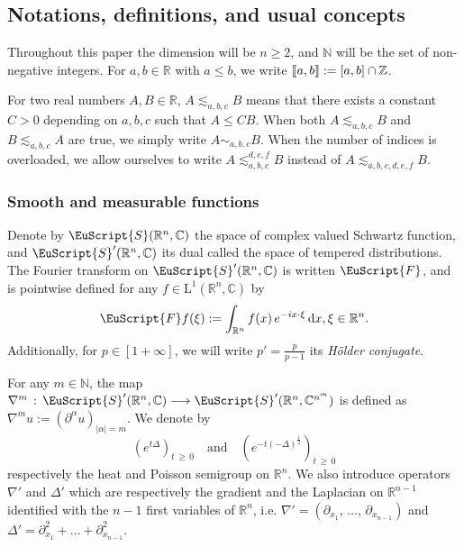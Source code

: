 \documentclass[10pt]{amsart}
\theoremstyle{definition}\newtheorem{defi}[theo]{Definition}\newtheorem{rema}[theo]{Remark}\newtheorem{exam}[theo]{Example}\newtheorem{exem}[theo]{Example}\newtheorem{nota}[theo]{Notation}
\newcommand{\bbR}{\mathbb{R}}
\newcommand{\bbC}{\mathbb{C}}
\newcommand{\bbN}{\mathbb{N}}
\newcommand{\bbZ}{\mathbb{Z}}
\newcommand{\rmd}{\mathrm{d}}
\newcommand{\rmL}{\mathrm{L}}
\newcommand{\eus}{\EuScript}
\newcommand{\llbracket}{\mathopen{[\mkern -2.7mu[}}
\newcommand{\rrbracket}{\mathclose{]\mkern -2.7mu]}}
\newcommand{\llb}{\llbracket}
\newcommand{\rrb}{\rrbracket}
\begin{document}
\subsection{Notations, definitions, and usual concepts}

Throughout this paper the dimension will be $n\geqslant 2$, and $\bbN $ will be the set of non-negative integers. For $a,b\in\bbR$ with $a\leqslant b$, we write $\llb a,b\rrb:=[a,b]\cap\bbZ$.

For two real numbers $A,B\in\bbR$, $A\lesssim_{a,b,c} B$ means that there exists a constant $C>0$ depending on ${a,b,c}$ such that $A\leqslant C B$. When both $A\lesssim_{a,b,c} B$ and $B \lesssim_{a,b,c} A$ are true, we simply write $A\sim_{a,b,c} B$. When the number of indices is overloaded, we allow ourselves to write $A\lesssim_{a,b,c}^{d,e,f} B$ instead of $A\lesssim_{a,b,c,d,e,f} B$.

\subsubsection{Smooth and measurable functions}

Denote by $\eus{S}(\bbR^n,\bbC)$ the space of complex valued Schwartz function, and
$\eus{S}'(\bbR^n,\bbC)$ its dual called the space of tempered distributions. The Fourier transform on $\eus{S}'(\bbR^n,\bbC)$ is written $\eus{F}$, and is pointwise defined for any $f\in\rmL^1(\bbR^n,\bbC)$ by
\begin{align*}
\eus{F}f(\xi):=\int_{\bbR^n} f(x)\,
e^{-ix\cdot\xi}\,\rmd x, \xi\in\bbR^n.
\end{align*}
Additionally, for $p\in[1+\infty]$, we will write $p'=\tfrac{p}{p-1}$ its
\emph{H\"older conjugate}.

For any $m\in\bbN $, the map $\nabla^m\,:\,\eus{S}'(\bbR^n,\bbC)\longrightarrow \eus{S}'(\bbR^n,\bbC^{n^m})$ is defined as $\nabla^m u:= (\partial^\alpha u)_{|\alpha|=m}$. We denote by
\[
\left(e^{t\Delta}\right)_{t\,\geqslant\,0}\quad \text{and} \quad\left(e^{-t(-\Delta)^\frac{1}{2}}\right)_{t\,\geqslant\,0}
\]
respectively the heat and Poisson semigroup on $\bbR^n$. We also introduce operators $\nabla'$ and $\Delta'$ which are respectively the gradient and the Laplacian on $\bbR^{n-1}$ identified with the $n-1$ first variables of $\bbR^n$, i.e. $\nabla'=(\partial_{x_1},\,\ldots,\, \partial_{x_{n-1}})$ and $\Delta' = \partial_{x_1}^2 + \ldots + \partial_{x_{n-1}}^2$.
\end{document}
